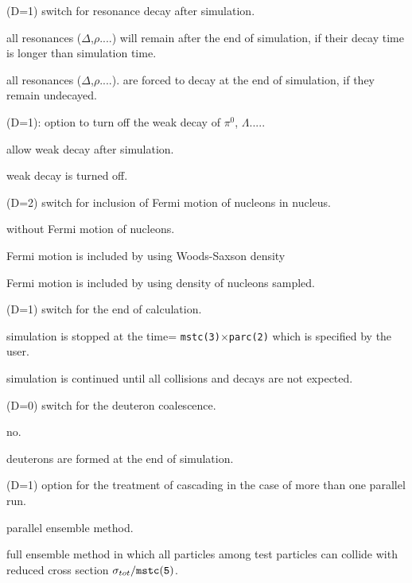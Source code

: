 \documentclass[]{article}
\newenvironment{entry}%
{\begin{list}{}{\setlength{\topsep}{0mm} \setlength{\itemsep}{0mm}
\setlength{\parskip}{0mm} \setlength{\parsep}{0mm}
\setlength{\leftmargin}{20mm} \setlength{\rightmargin}{0mm}
\setlength{\labelwidth}{18mm} \setlength{\labelsep}{2mm}}}%
{\end{list}}
\newenvironment{subentry}%
{\begin{list}{}{\setlength{\topsep}{0mm} \setlength{\itemsep}{0mm}
\setlength{\parskip}{0mm} \setlength{\parsep}{0mm}
\setlength{\leftmargin}{10mm} \setlength{\rightmargin}{0mm}
\setlength{\labelwidth}{18mm} \setlength{\labelsep}{2mm}}}%
{\end{list}}
\newcommand{\ttt}[1]{{\tt#1}}
\newcommand{\itemt}[1]{\item[{\tt #1}\hfill]}
\begin{document}
\begin{entry}
\medskip

\itemt{mstc(41)  :} (D=1) switch for resonance decay after simulation.
  \begin{subentry}
    \itemt{$=0$} all resonances ($\Delta$,$\rho$....) will remain
                 after the end of simulation,
                 if their decay time is longer than simulation time.
    \itemt{$=1$} all resonances ($\Delta$,$\rho$....).
                 are forced to decay at the end of simulation,
                 if they remain undecayed.
    \end{subentry}

\itemt{mstc(42)  :} (D=1): option to turn off the weak decay of $\pi^0$,
 $\Lambda$.....
    \begin{subentry}
        \itemt{$=0$:} allow weak decay after simulation.
        \itemt{$=1$:} weak decay is turned off.
    \end{subentry}
\itemt{mstc(43)  :} (D=2) switch for inclusion of Fermi motion of nucleons
                    in nucleus.
    \begin{subentry}
       \itemt{$=0$ :} without Fermi motion of nucleons.
       \itemt{$=1$ :} Fermi motion is included by using Woods-Saxson density
       \itemt{$=2$ :} Fermi motion is included by using density of nucleons
       sampled.
    \end{subentry}

\itemt{mstc(44)  :} (D=1) switch for the end of calculation.
    \begin{subentry}
       \itemt{$=1$ :} simulation is stopped at the time=
         \ttt{mstc(3)$\times$parc(2)} which is
         specified by the user.
       \itemt{$=2$ :}  simulation is continued until all collisions
        and decays are not expected.
    \end{subentry}

\itemt{mstc(45)  :} (D=0) switch for the deuteron coalescence.
    \begin{subentry}
       \itemt{$=0$ :} no.
       \itemt{$=1$ :} deuterons are formed at the end of simulation.
    \end{subentry}

\itemt{mstc(46)  :} (D=1) option for the treatment of cascading 
   in the case of more than one parallel run.
    \begin{subentry}
       \itemt{$=1$ :} parallel ensemble method.
       \itemt{$=2$ :} full ensemble method in which all particles
                      among test particles can collide
                      with reduced cross section
                      $\sigma_{tot}/\tt{mstc(5)}$.
    \end{subentry}



\end{entry}
\end{document}
